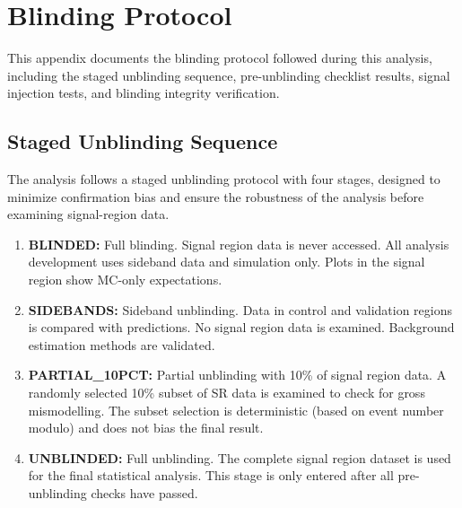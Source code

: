 
\section{Blinding Protocol}
\label{sec:blinding}


This appendix documents the blinding protocol followed during this analysis,
including the staged unblinding sequence, pre-unblinding checklist results,
signal injection tests, and blinding integrity verification.

\subsection{Staged Unblinding Sequence}
\label{sec:blinding:stages}

The analysis follows a staged unblinding protocol with four stages, designed
to minimize confirmation bias and ensure the robustness of the analysis
before examining signal-region data.

\begin{enumerate}
  \item \textbf{BLINDED:} Full blinding. Signal region data is never accessed.
        All analysis development uses sideband data and simulation only.
        Plots in the signal region show MC-only expectations.

  \item \textbf{SIDEBANDS:} Sideband unblinding. Data in control and validation
        regions is compared with predictions. No signal region data is
        examined. Background estimation methods are validated.

  \item \textbf{PARTIAL\_10PCT:} Partial unblinding with 10\% of signal region
        data. A randomly selected 10\% subset of SR data is examined to
        check for gross mismodelling. The subset selection is deterministic
        (based on event number modulo) and does not bias the final result.

  \item \textbf{UNBLINDED:} Full unblinding. The complete signal region dataset
        is used for the final statistical analysis. This stage is only
        entered after all pre-unblinding checks have passed.
\end{enumerate}

